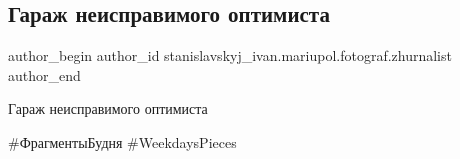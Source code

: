  
 
 
 
 

\subsection{Гараж неисправимого оптимиста}
\label{sec:09_01_2020.fb.stanislavskyj_ivan.mariupol.fotograf.zhurnalist.1.garazh_neispravimogo_optimista}

\ifcmt
 author_begin
   author_id stanislavskyj_ivan.mariupol.fotograf.zhurnalist
 author_end
\fi

Гараж неисправимого оптимиста

\#ФрагментыБудня \#WeekdaysPieces

